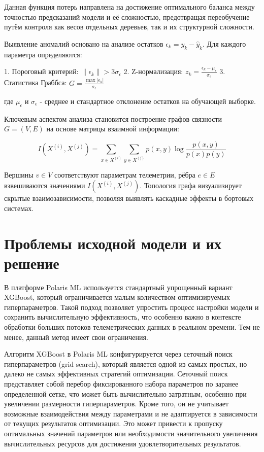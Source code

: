 Данная функция потерь направлена на достижение оптимального баланса между
точностью предсказаний модели и её сложностью, предотвращая переобучение путём
контроля как весов отдельных деревьев, так и их структурной сложности.

Выявление аномалий основано на анализе остатков $\epsilon_k = y_k - \hat{y}_k$. Для каждого параметра определяются:

1. Пороговый критерий: $\|\epsilon_k\| > 3\sigma_\epsilon$
2. Z-нормализация: $z_k = \frac{\epsilon_k - \mu_\epsilon}{\sigma_\epsilon}$
3. Статистика Граббса: $G = \frac{\max |\epsilon_k|}{\sigma_\epsilon}$

где $\mu_\epsilon$ и $\sigma_\epsilon$ - среднее и стандартное отклонение остатков на обучающей выборке.

Ключевым аспектом анализа становится построение графов связности $G=(V,E)$ на
основе матрицы взаимной информации:

\[
	I(X^{(i)}, X^{(j)}) = \sum_{x \in X^{(i)}} \sum_{y \in X^{(j)}} p(x,y) \log \frac{p(x,y)}{p(x)p(y)}
\]

Вершины $v \in V$ соответствуют параметрам телеметрии, рёбра $e \in E$
взвешиваются значениями $I(X^{(i)}, X^{(j)})$. Топология графа визуализирует
скрытые взаимозависимости, позволяя выявлять каскадные эффекты в бортовых
системах.

\section{Проблемы исходной модели и их решение}

В платформе Polaris ML используется стандартный упрощенный вариант XGBoost, который ограничивается малым количеством оптимизируемых гиперпараметров. Такой подход позволяет упростить процесс настройки модели и сохранить вычислительную эффективность, что особенно важно в контексте обработки больших потоков телеметрических данных в реальном времени. Тем не менее, данный метод имеет свои ограничения.

Алгоритм XGBoost в Polaris ML конфигурируется через сеточный поиск гиперпараметров (grid search), который является одной из самых простых, но далеко не самых эффективных стратегий оптимизации. Сеточный поиск представляет собой перебор фиксированного набора параметров по заранее определенной сетке, что может быть вычислительно затратным, особенно при увеличении размерности гиперпараметров. Кроме того, он не учитывает возможные взаимодействия между параметрами и не адаптируется в зависимости от текущих результатов оптимизации. Это может привести к пропуску оптимальных значений параметров или необходимости значительного увеличения вычислительных ресурсов для достижения удовлетворительных результатов.

